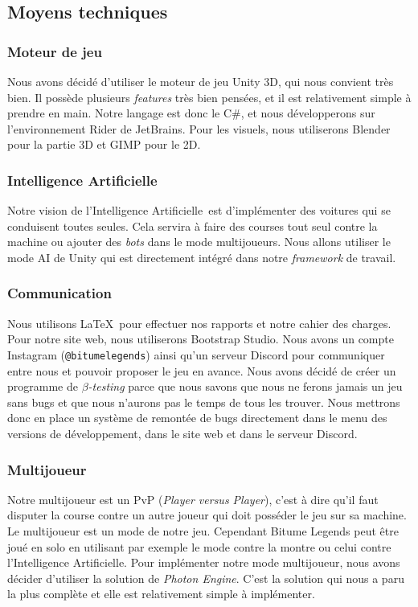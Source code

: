 \documentclass[11pt,a4paper]{article}
\newcommand{\AI}{Intelligence Artificielle}
\begin{document}
  \subsection{Moyens techniques}
    \subsubsection{Moteur de jeu}
      Nous avons décidé d'utiliser le moteur de jeu Unity 3D, qui nous convient très bien. Il possède plusieurs 
      \textit{features} très bien pensées, et il est relativement simple à prendre en main. Notre langage est 
      donc le C\#, et nous développerons sur l'environnement Rider de JetBrains. Pour les visuels, nous
      utiliserons Blender pour la partie 3D et GIMP pour le 2D.
    \subsubsection{\AI}
      Notre vision de l'\AI\, est d'implémenter des voitures qui se conduisent toutes seules.
      Cela servira à faire des courses tout seul contre la machine ou ajouter des \textit{bots} dans le mode 
      multijoueurs. Nous allons utiliser le mode AI de Unity qui est directement intégré
      dans notre \textit{framework} de travail.
    \subsubsection{Communication}
      Nous utilisons \LaTeX\, pour effectuer nos rapports et notre cahier des charges. Pour notre site web, 
      nous utiliserons Bootstrap Studio. Nous avons un compte Instagram (\texttt{@bitumelegends}) 
      ainsi qu'un serveur Discord pour communiquer entre nous et pouvoir proposer le jeu en avance.
      Nous avons décidé de créer un programme de \(\beta\)\textit{-testing} parce que nous savons que nous 
      ne ferons jamais un jeu sans bugs et que nous n'aurons pas le temps de tous les trouver. Nous mettrons
      donc en place un système de remontée de bugs directement dans le menu des versions de développement, 
      dans le site web et dans le serveur Discord.
    \subsubsection{Multijoueur}
      Notre multijoueur est un PvP (\textit{Player versus Player}), c'est à dire qu'il faut disputer la course 
      contre un autre joueur qui doit posséder le jeu sur sa machine. Le multijoueur est un mode de notre jeu. 
      Cependant Bitume Legends peut être joué en solo en utilisant par exemple le mode contre la montre ou 
      celui contre l'Intelligence Artificielle. Pour implémenter notre mode multijoueur, nous avons décider 
      d'utiliser la solution de \emph{Photon Engine}. C'est la solution qui nous a paru la plus complète et 
      elle est relativement simple à implémenter.
\end{document}
